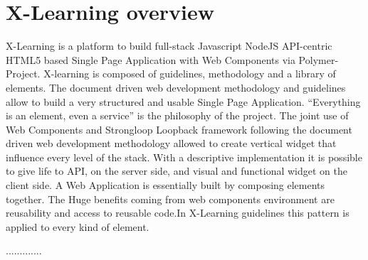 \section{X-Learning overview}
\label{sec:x_learning_overview}

X-Learning is a platform to build full-stack Javascript NodeJS API-centric HTML5 based Single Page Application with Web Components via Polymer- Project. X-learning is composed of guidelines, methodology and a library of elements. The document driven web development methodology and guidelines allow to build a very structured and usable Single Page Application. 
“Everything is an element, even a service” is the philosophy of the project. The joint use of Web Components and Strongloop Loopback framework following the document driven web development methodology allowed to create vertical widget that influence every level of the stack. With a descriptive implementation it is possible to give life to API, on the server side, and visual and functional widget on the client side. A Web Application is essentially built by composing elements together. The Huge benefits coming from web components environment are reusability and access to reusable code.In X-Learning guidelines this pattern is applied to every kind of element.

.............